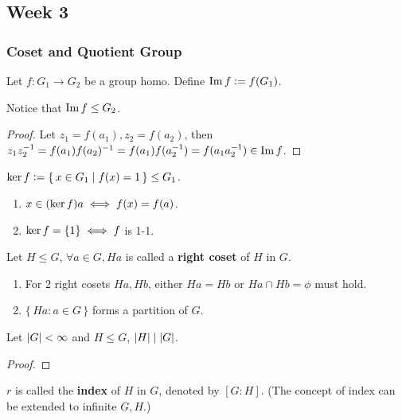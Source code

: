 \subsection{Week 3}
\subsubsection{Coset and Quotient Group}
Let $f: G_1 \to G_2$ be a group homo. Define $\operatorname{Im} f \vcentcolon= f(G_1)$.

Notice that $\operatorname{Im} f \le G_2$.
\begin{proof}
  Let $z_1 = f(a_1), z_2 = f(a_2)$, then
  $z_1z_2^{-1} = f(a_1)f(a_2)^{-1} = f(a_1)f(a_2^{-1}) = f(a_1a_2^{-1}) \in
  \operatorname{Im} f$.
\end{proof}

\begin{definition}
  $\operatorname{ker} f \vcentcolon= \{\, x \in G_1 \mid f(x) = 1 \,\} \le G_1$.
\end{definition}

\begin{fact} \mbox{}
  \begin{enumerate}
    \item $x \in (\operatorname{ker} f) a \iff f(x) = f(a)$.
    \item $\operatorname{ker} f = \{ 1 \} \iff f$ is 1-1.
  \end{enumerate}
\end{fact}

\begin{definition}
  Let $H \le G$, $\forall a \in G, Ha$ is called a {\bf right coset} of $H$
  in $G$.
\end{definition}

\begin{fact} \mbox{}
  \begin{enumerate}
    \item For 2 right cosets $Ha, Hb$, either $Ha = Hb$ or $Ha \cap Hb = \phi$
      must hold.
    \item $\{\, Ha : a\in G \,\}$ forms a partition of $G$.
  \end{enumerate}
\end{fact}

\begin{theorem}[Lagrange]
  Let $\lvert G\rvert < \infty$ and $H \le G$, $\lvert H\rvert \mid \lvert G\rvert$.
  \begin{proof}
  \end{proof}
\end{theorem}

\begin{remark}
  $r$ is called the {\bf index} of $H$ in $G$, denoted by $[G:H]$.
  (The concept of index can be extended to infinite $G, H$.)
\end{remark}

